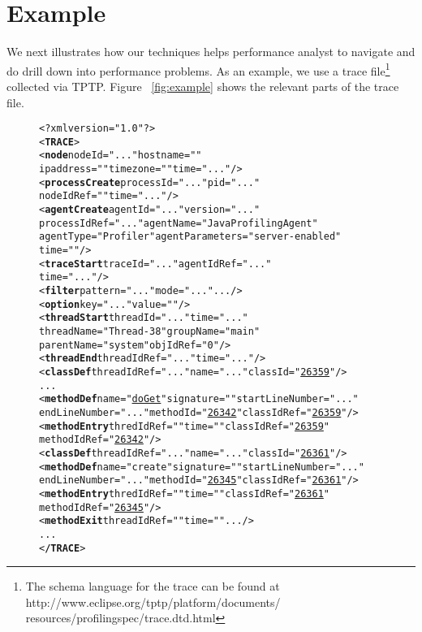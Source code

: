 \section{Example}
\label{sec:example}
%

We next illustrates how our techniques helps performance analyst to navigate and do drill down into performance problems. As an example, we use a trace file\footnote{The schema language for the trace can be found at http://www.eclipse.org/tptp/platform/documents/\\
resources/profilingspec/trace.dtd.html} collected via TPTP.
Figure ~\ref{fig:example} shows the relevant parts of the trace file.

\begin{figure}[t]
\begin{CodeOut}
\begin{alltt}
<?xml version="1.0"?>
<\textbf{TRACE}>
<\textbf{node} nodeId="..." hostname=""
 ipaddress="" timezone="" time="..."/>
<\textbf{processCreate} processId="..." pid="..."
 nodeIdRef="" time="..."/>
<\textbf{agentCreate} agentId="..." version="..."
 processIdRef="..." agentName="Java Profiling Agent"
 agentType="Profiler" agentParameters="server-enabled"
 time=""/>
<\textbf{traceStart} traceId="..." agentIdRef="..."
 time="..."/>
<\textbf{filter} pattern="..." mode="..." .../>
<\textbf{option} key="..." value=""/>
<\textbf{threadStart} threadId="..." time="..."
 threadName="Thread-38" groupName="main"
 parentName="system" objIdRef="0"/>
<\textbf{threadEnd} threadIdRef="..." time="..." />
<\textbf{classDef} threadIdRef="..." name="..." classId="\underline{26359}"/>
...
<\textbf{methodDef} name="\underline{doGet}" signature="" startLineNumber="..."
 endLineNumber="..." methodId="\underline{26342}" classIdRef="\underline{26359}"/>
<\textbf{methodEntry} thredIdRef="" time="" classIdRef="\underline{26359}"
 methodIdRef="\underline{26342}"/>
<\textbf{classDef} threadIdRef="..." name="..." classId="\underline{26361}"/>
<\textbf{methodDef} name="create" signature="" startLineNumber="..."
 endLineNumber="..." methodId="\underline{26345}" classIdRef="\underline{26361}"/>
<\textbf{methodEntry} thredIdRef="" time="" classIdRef="\underline{26361}"
 methodIdRef="\underline{26345}"/>
<\textbf{methodExit} threadIdRef="" time="".../>
...
<\textbf{/TRACE}>
\end{alltt}
\end{CodeOut}\vspace*{-2ex}
\vspace*{-3ex}
\end{figure}

